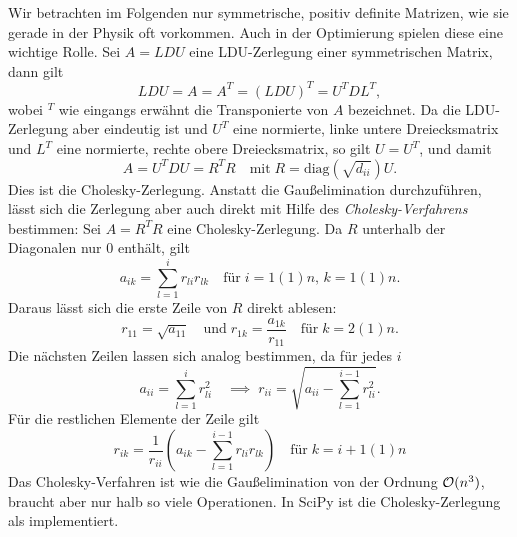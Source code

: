 Wir betrachten im Folgenden nur symmetrische, positiv definite
Matrizen, wie sie gerade in der Physik oft vorkommen. Auch in der
Optimierung spielen diese eine wichtige Rolle. Sei $A=LDU$ eine
LDU-Zerlegung einer symmetrischen Matrix, dann gilt
\begin{equation}
  LDU = A = A^T = (LDU)^T = U^T D L^T,
\end{equation}
wobei $^T$ wie eingangs erwähnt die Transponierte von $A$ bezeichnet.
Da die LDU-Zerlegung aber eindeutig ist und $U^T$ eine normierte,
linke untere Dreiecksmatrix und $L^T$ eine normierte, rechte obere
Dreiecksmatrix, so gilt $U=U^T$, und damit
\begin{equation}
  A = U^TDU = R^TR \quad\text{mit}\; R=\text{diag}(\sqrt{d_{ii}})U.
\end{equation}
Dies ist die Cholesky-Zerlegung. Anstatt die Gaußelimination
durchzuführen, lässt sich die Zerlegung aber auch direkt mit Hilfe des
\emph{Cholesky-Verfahrens} bestimmen: Sei
$A=R^TR$ eine Cholesky-Zerlegung.
Da $R$ unterhalb der Diagonalen nur 0 enthält, gilt
\begin{equation}
  a_{ik} = \sum_{l=1}^{i} r_{li}r_{lk} \quad\text{für}\;
  i=1(1)n,\,k=1(1)n.
\end{equation}
Daraus lässt sich die erste Zeile von $R$ direkt ablesen:
\begin{equation}
r_{11} = \sqrt{a_{11}}\quad\text{und}\;
r_{1k} = \frac{a_{1k}}{r_{11}} \quad\text{für}\;k=2(1)n.
\end{equation}
Die nächsten Zeilen lassen sich analog bestimmen, da für jedes $i$
\begin{equation}
  a_{ii} = \sum_{l=1}^{i} r_{li}^2\quad\implies\;
  r_{ii} = \sqrt{a_{ii} - \sum_{l=1}^{i-1} r_{li}^2}.
\end{equation}
Für die restlichen Elemente der Zeile gilt
\begin{equation}
  r_{ik} = \frac{1}{r_{ii}}\left(a_{ik} - \sum_{l=1}^{i-1}r_{li}r_{lk}\right) \quad\text{für}\;k=i+1(1)n
\end{equation}
Das Cholesky-Verfahren ist wie die Gaußelimination von der Ordnung
$\mathcal O(n^3)$, braucht aber nur halb so viele Operationen. In SciPy ist die
Cholesky-Zerlegung als  implementiert.

\section{}

